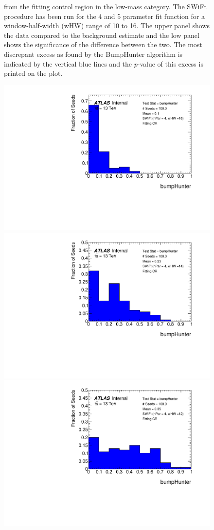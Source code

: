 \begin{figure}[!htb]
{  from the fitting control region in the low-mass category.
  The SWiFt procedure has been run for the 4 and 5 parameter fit function for a window-half-width (wHW) range of 10 to 16.
  The upper panel shows the data compared to the background estimate and the low panel shows the significance of the difference between the two.
  The most discrepant excess as found by the {\sc BumpHunter} algorithm is indicated by the vertical blue lines and the $p$-value of this excess is printed on the plot. 
}
\end{figure}

\begin{figure}[!htb]
\captionsetup[subfigure]{aboveskip=0pt,justification=centering}
\centering
{} {
  \includegraphics[width=0.3\linewidth, angle=0]{figs/Dibjet/LowMass/FitStudy/pVal_bumpHunter_corrFitCR_4para_low16_high16.pdf}
}                                                                                              
 {                                                    
  \includegraphics[width=0.3\linewidth, angle=0]{figs/Dibjet/LowMass/FitStudy/pVal_bumpHunter_corrFitCR_4para_low14_high14.pdf}
}                                                                                              
 {                                                    
  \includegraphics[width=0.3\linewidth, angle=0]{figs/Dibjet/LowMass/FitStudy/pVal_bumpHunter_corrFitCR_4para_low12_high12.pdf}
}
\end{figure}

